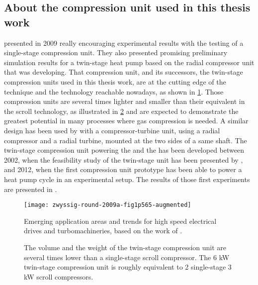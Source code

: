 \subsection{About the compression unit used in this thesis work}
\label{sec:sota-jurg-cp}

\citet{Schiffmann-Favrat-2009a} presented in 2009 really encouraging
experimental results with the testing of a single-stage compression
unit. They also presented promising preliminary simulation results for
a twin-stage heat pump based on the radial compressor unit that
\citet{schiffmann-2008a} was developing. That compression unit, and
its successors, the twin-stage compression units used in this thesis
work, are at the cutting edge of the technique and the technology
reachable nowadays, as shown in \cref{fig:zwyssig}. Those compression
units are several times lighter and smaller than their equivalent in
the scroll technology, as illustrated in
\cref{fig:cp-unit-volume-comparison} and are expected to demonstrate
the greatest potential in many processes where gas compression is
needed. A similar design has been used by
\citet{demierre-wegele-2014a} with a compressor-turbine unit, using a
radial compressor and a radial turbine, mounted at the two sides of a
same shaft. The twin-stage
compression unit powering the \AWP{} and the \BWP{} has been
developed between 2002, when the feasibility study of the twin-stage
unit has been presented by \citet{schiffmann-godat-2002a}, and 2012,
when the first compression unit prototype has been able to power a
heat pump cycle in an experimental setup. The results of those first
experiments are presented in .

\begin{figure}[htbp]
  \centering
  \texttt{[image: zwyssig-round-2009a-fig1p565-augmented]}
  \caption[Trends for high speed electrical drives and
  turbomachineries.]
  {Emerging application areas and trends for high speed electrical
    drives and turbomachineries, based on the work of \citet[Fig.\,1,
    p.\,565]{zwyssig-round-2009a}.}
  \label{fig:zwyssig}
\end{figure}

\begin{figure}[htbp]
  \centering {}
  \hspace{1em} 
  \caption[Volume of the twin-stage compression unit]{The volume and
    the weight of the twin-stage compression unit are several times
    lower than a single-stage scroll compressor. The 6 kW twin-stage
    compression unit is roughly equivalent to 2 single-stage 3 kW
    scroll compressors.}
  \label{fig:cp-unit-volume-comparison}
\end{figure}

